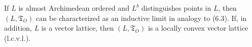 If $L$ is almost Archimedean ordered and $L^b$ distinguishes points in $L$, then $(L, \mathfrak{T}_O)$ can be characterized as an inductive limit in analogy to (6.3). If, in addition, $L$ is a vector lattice, then $(L, \mathfrak{T}_O)$ is a locally convex vector lattice (l.c.v.l.).
